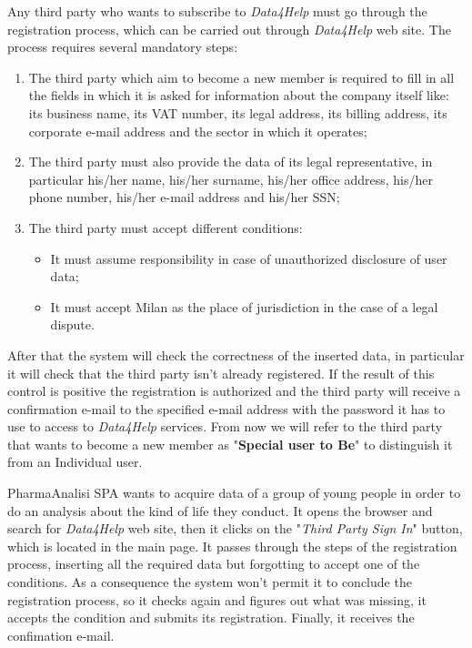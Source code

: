 Any third party who wants to subscribe to \textit{Data4Help} must go through the registration process, which can be carried out through \textit{Data4Help} web site. The process requires several mandatory steps:
\begin{enumerate}
  \item The third party which aim to become a new member is required to fill in all the fields in which it is asked for information about the company itself like: its business name, its VAT number, its legal address, its billing address, its corporate e-mail address and the sector in which it operates;
  \item The third party must also provide the data of its legal representative, in particular his/her name, his/her surname, his/her office address, his/her phone number, his/her e-mail address and his/her SSN;
  \item The third party must accept different conditions:
    \begin{itemize}
      \item It must assume responsibility in case of unauthorized disclosure of user data;
      \item It must accept Milan as the place of jurisdiction in the case of a legal dispute.
    \end{itemize}
\end{enumerate}
After that the system will check the correctness of the inserted data, in particular it will check that the third party isn't already registered. If the result of this control is positive the registration is authorized and the third party will receive a confirmation e-mail to the specified e-mail address with the password it has to use to access to \textit{Data4Help} services.
From now we will refer to the third party that wants to become a new member as "\textbf{Special user to Be}" to distinguish it from an Individual user.

PharmaAnalisi SPA wants to acquire data of a group of young people in order to do an analysis about the kind of life they conduct. It opens the browser and search for \textit{Data4Help} web site, then it clicks on the "\textit{Third Party Sign In}" button, which is located in the main page. It passes through the steps of the registration process, inserting all the required data but forgotting to accept one of the conditions. As a consequence the system won't permit it to conclude the registration process, so it checks again and figures out what was missing, it accepts the condition and submits its registration. Finally, it receives the confimation e-mail.

